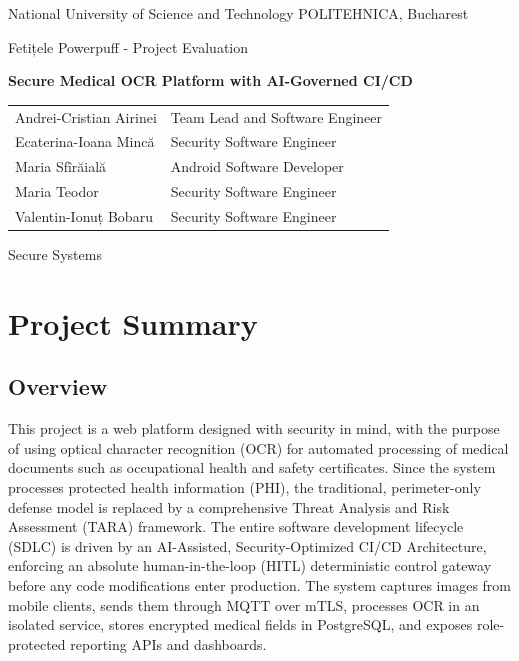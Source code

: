 \documentclass[12pt,a4paper]{article}
\begin{document}
\begin{titlepage}
    \centering
    {\large National University of Science and Technology POLITEHNICA,
    Bucharest\par}

    \vfill

    {\LARGE Fetițele Powerpuff - Project Evaluation\par}
    \vspace{0.8cm}
    {\Huge\bfseries Secure Medical OCR Platform with AI-Governed CI/CD\par}
    \vspace{1.2cm}

   \begin{tabular}{>{\centering\arraybackslash}p{}
   >{\centering\arraybackslash}p{}}
        Andrei-Cristian Airinei & Team Lead and Software Engineer \\
        Ecaterina-Ioana Mincă & Security Software Engineer \\
        Maria Sfîrăială & Android Software Developer \\
        Maria Teodor & Security Software Engineer \\
        Valentin-Ionuț Bobaru & Security Software Engineer \\
    \end{tabular}

    \vfill
    {\LARGE Secure Systems\par}
\end{titlepage}

\section{Project Summary}
\subsection{Overview}
This project is a web platform designed with security in mind, with the
 purpose of using optical character recognition (OCR) for automated 
 processing of medical documents such as occupational health and safety 
 certificates. Since the system processes protected health information (PHI), 
 the traditional, perimeter-only defense model is replaced by a comprehensive 
 Threat Analysis and Risk Assessment (TARA) framework. The entire software 
 development lifecycle (SDLC) is driven by an AI-Assisted, Security-Optimized 
 CI/CD Architecture, enforcing an absolute human-in-the-loop (HITL) 
 deterministic control gateway before any code modifications enter production. 
 The system captures images from mobile clients, sends them through MQTT over 
 mTLS, processes OCR in an isolated service, stores encrypted medical 
 fields in PostgreSQL, and exposes role-protected reporting APIs and 
 dashboards.
\end{document}
